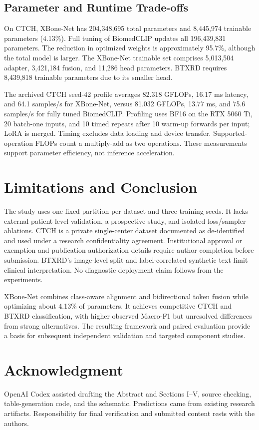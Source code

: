 \documentclass[conference,a4paper]{IEEEtran}
\begin{document}
\subsection{Parameter and Runtime Trade-offs}
On CTCH, XBone-Net has 204,348,695 total parameters and 8,445,974 trainable parameters (4.13\%). Full tuning of BiomedCLIP updates all 196,439,831 parameters. The reduction in optimized weights is approximately 95.7\%, although the total model is larger. The XBone-Net trainable set comprises 5,013,504 adapter, 3,421,184 fusion, and 11,286 head parameters. BTXRD requires 8,439,818 trainable parameters due to its smaller head.

The archived CTCH seed-42 profile averages 82.318 GFLOPs, 16.17 ms latency, and 64.1 samples/s for XBone-Net, versus 81.032 GFLOPs, 13.77 ms, and 75.6 samples/s for fully tuned BiomedCLIP. Profiling uses BF16 on the RTX 5060 Ti, 20 batch-one inputs, and 10 timed repeats after 10 warm-up forwards per input; LoRA is merged. Timing excludes data loading and device transfer. Supported-operation FLOPs count a multiply-add as two operations. These measurements support parameter efficiency, not inference acceleration.

\section{Limitations and Conclusion}
The study uses one fixed partition per dataset and three training seeds. It lacks external patient-level validation, a prospective study, and isolated loss/sampler ablations. CTCH is a private single-center dataset documented as de-identified and used under a research confidentiality agreement. Institutional approval or exemption and publication authorization details require author completion before submission. BTXRD's image-level split and label-correlated synthetic text limit clinical interpretation. No diagnostic deployment claim follows from the experiments.

XBone-Net combines class-aware alignment and bidirectional token fusion while optimizing about 4.13\% of parameters. It achieves competitive CTCH and BTXRD classification, with higher observed Macro-F1 but unresolved differences from strong alternatives. The resulting framework and paired evaluation provide a basis for subsequent independent validation and targeted component studies.

\section*{Acknowledgment}
OpenAI Codex assisted drafting the Abstract and Sections I--V, source checking, table-generation code, and the schematic. Predictions came from existing research artifacts. Responsibility for final verification and submitted content rests with the authors.



\end{document}
